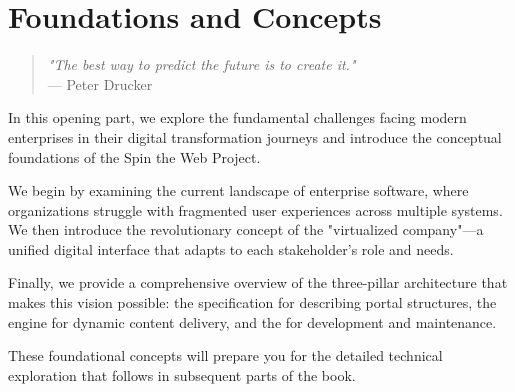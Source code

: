 
\part{Foundations and Concepts}
\label{part:foundations}

\begin{quote}
\textit{"The best way to predict the future is to create it."} \\
— Peter Drucker
\end{quote}

In this opening part, we explore the fundamental challenges facing modern enterprises in their digital transformation journeys and introduce the conceptual foundations of the Spin the Web Project. 

We begin by examining the current landscape of enterprise software, where organizations struggle with fragmented user experiences across multiple systems. We then introduce the revolutionary concept of the "virtualized company"—a unified digital interface that adapts to each stakeholder's role and needs.

Finally, we provide a comprehensive overview of the three-pillar architecture that makes this vision possible: the \wbdl specification for describing portal structures, the \webspinner engine for dynamic content delivery, and the \studio for development and maintenance.

These foundational concepts will prepare you for the detailed technical exploration that follows in subsequent parts of the book.

